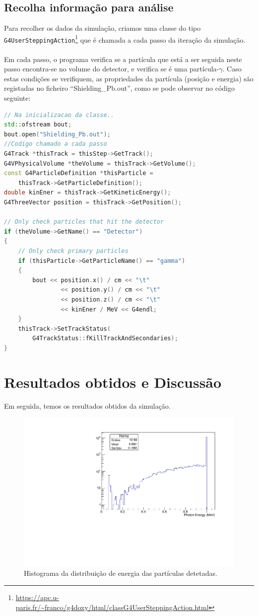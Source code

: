 \documentclass[a4paper, 12pt]{article} %
\begin{document}
	\subsection{Recolha informação para análise }
	Para recolher os dados da simulação, criamos uma classe do tipo \texttt{G4UserSteppingAction}\footnote{\url{https://apc.u-paris.fr/~franco/g4doxy/html/classG4UserSteppingAction.html}} que é chamada a cada passo da iteração da simulação.

	\paragraph{} Em cada passo, o programa verifica se a partícula que está a ser seguida neste passo encontra-se no volume do detector, e verifica se é uma partícula-$\gamma$. Caso estas condições se verifiquem, as propriedades da partícula (posição e energia) são registadas no ficheiro ``Shielding\_Pb.out'', como se pode observar no código seguinte:

	\begin{lstlisting}[language=C++]
// Na inicializacao da classe..
std::ofstream bout;
bout.open("Shielding_Pb.out");
//Codigo chamado a cada passo
G4Track *thisTrack = thisStep->GetTrack();
G4VPhysicalVolume *theVolume = thisTrack->GetVolume();
const G4ParticleDefinition *thisParticle = 
	thisTrack->GetParticleDefinition();
double kinEner = thisTrack->GetKineticEnergy();
G4ThreeVector position = thisTrack->GetPosition();

// Only check particles that hit the detector
if (theVolume->GetName() == "Detector")
{
	// Only check primary particles
	if (thisParticle->GetParticleName() == "gamma")
	{
		bout << position.x() / cm << "\t"
				<< position.y() / cm << "\t"
				<< position.z() / cm << "\t"
				<< kinEner / MeV << G4endl;
	}
	thisTrack->SetTrackStatus(
		G4TrackStatus::fKillTrackAndSecondaries);
}
	\end{lstlisting}
	

	\section{Resultados obtidos e Discussão}
	Em seguida, temos os resultados obtidos da simulação.

	\begin{figure}[H]
		\centering
		\includegraphics[width=0.5\linewidth]{energy_pop.pdf}
		\caption{Histograma da distribuição de energia das partículas detetadas.}
		\label{fig:energy_population}
	\end{figure}
\end{document}
